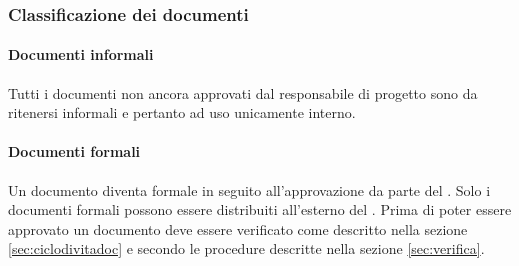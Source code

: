         \subsubsection{Classificazione dei documenti}\label{sec:classificazionedocumenti}
            \paragraph{Documenti informali}
            Tutti i documenti non ancora approvati dal responsabile di progetto sono da ritenersi informali e pertanto ad uso unicamente interno.
            \paragraph{Documenti formali}
            Un documento diventa formale in seguito all'approvazione da parte del \responsabilediprogetto. Solo i documenti formali possono essere distribuiti all'esterno del . Prima di poter essere approvato un documento deve essere verificato come descritto nella sezione \ref{sec:ciclodivitadoc} e secondo le procedure descritte nella sezione \ref{sec:verifica}.
